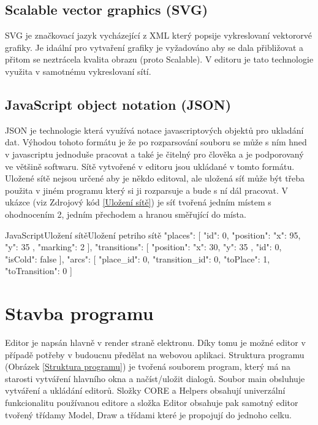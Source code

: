 \documentclass[
  biblatex,
  glossaries,
  index
]{kidiplom}
\begin{document}
\subsection{Scalable vector graphics (SVG)}
SVG je značkovací jazyk vycházející z XML který popsije vykreslovaní 
vektororvé grafiky. Je idaální pro vytvaření grafiky je vyžadováno
aby se dala přibližovat a přitom se neztrácela kvalita obrazu (proto Scalable).
V editoru je tato technologie využita v samotnému vykreslovaní sítí.

\subsection{JavaScript object notation (JSON)}
JSON je technologie která využívá notace javascriptových objektů pro ukladání dat.
Výhodou tohoto formátu je že po rozparsování souboru se může s ním hned v 
javascriptu jednoduše pracovat a také je čitelný pro člověka a je podporovaný ve většině softwaru.
Sítě vytvořené v editoru jsou ukládané v tomto formátu.
Uložené sítě nejsou určené aby je někdo editoval, ale uložená síť může být třeba 
použita v jiném programu který si ji rozparsuje a bude s ní dál pracovat.
V ukázce (viz Zdrojový kód \ref{Uložení sítě}) je síť tvořená jedním místem s ohodnocením 2, 
jedním přechodem a hranou směřující do místa.

\begin{kicode}{JavaScript}{Uložení sítě}{Uložení petriho sítě}
{
  "places": [
    {
      "id": 0,
      "position": {
        "x": 95, "y": 35
      },
      "marking": 2
    }
  ],
  "transitions": [
    {
      "position": {
        "x": 30, "y": 35
      },
      "id": 0,
      "isCold": false
    }
  ],
  "arcs": [
    {
      "place_id": 0,
      "transition_id": 0,
      "toPlace": 1,
      "toTransition": 0
    }
  ]
}
\end{kicode}

\clearpage
\section{Stavba programu}

Editor je napsán hlavně v render straně elektronu. Díky tomu je možné 
editor v případě potřeby v budoucnu předělat na webovou aplikaci.
Struktura programu (Obrázek \ref{Struktura programu}) je tvořená 
souborem program, který má na starosti vytváření hlavního okna 
a načíst/uložit dialogů. Soubor main obsluhuje vytváření
a ukládání editorů. Složky CORE a Helpers obsahují univerzální 
funkcionalitu používanou editore a složka Editor obsahuje pak samotný editor
tvořený třídamy Model, Draw a třídami které je propojují do jednoho celku.
\end{document}
